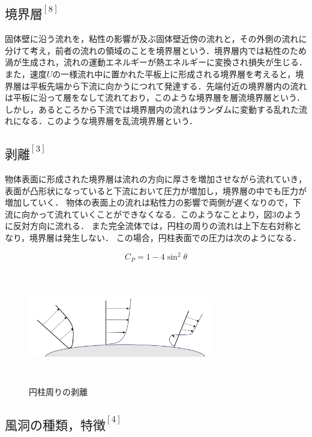 \documentclass[a4paper,titlepage]{ltjsarticle}
\begin{document}
\subsection{$境界層^{[8]}$}
  固体壁に沿う流れを，粘性の影響が及ぶ固体壁近傍の流れと，その外側の流れに分けて考え，前者の流れの領域のことを境界層という．境界層内では粘性のため渦が生成され，流れの運動エネルギーが熱エネルギーに変換され損失が生じる．
  また，速度$U$の一様流れ中に置かれた平板上に形成される境界層を考えると，境界層は平板先端から下流に向かうにつれて発達する．先端付近の境界層内の流れは平板に沿って層をなして流れており，このような境界層を層流境界層という．しかし，あるところから下流では境界層内の流れはランダムに変動する乱れた流れになる．このような境界層を乱流境界層という．


\subsection{$剥離^{[3]}$}
 物体表面に形成された境界層は流れの方向に厚さを増加させながら流れていき，表面が凸形状になっていると下流において圧力が増加し，境界層の中でも圧力が増加していく．
 物体の表面上の流れは粘性力の影響で両側が遅くなりので，下流に向かって流れていくことができなくなる．このようなことより，図3のように反対方向に流れる．
 また完全流体では，円柱の周りの流れは上下左右対称となり，境界層は発生しない．
 この場合，円柱表面での圧力は次のようになる．
 
 \begin{equation}
  C_P=1-4\sin^2\theta
 \end{equation}

\begin{figure}[hbtp]
  \centering
  \includegraphics[height=5cm,width=8cm]{nagare3.png}
  \caption{円柱周りの剥離}
  \label{剥離}
\end{figure}


\subsection{$風洞の種類，特徴^{[4]}$}
\end{document}
